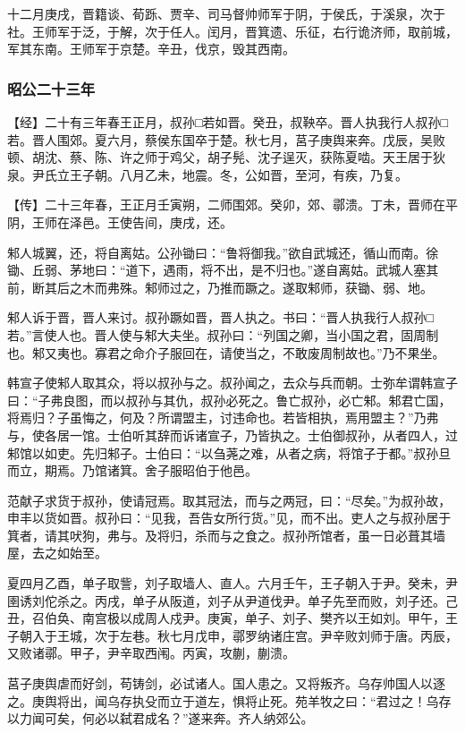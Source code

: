 \documentclass[]{article}
\begin{document}
十二月庚戌，晋籍谈、荀跞、贾辛、司马督帅师军于阴，于侯氏，于溪泉，次于社。王师军于泛，于解，次于任人。闰月，晋箕遗、乐征，右行诡济师，取前城，军其东南。王师军于京楚。辛丑，伐京，毁其西南。

\hypertarget{header-n2737}{%
\subsubsection{昭公二十三年}\label{header-n2737}}

【经】二十有三年春王正月，叔孙□若如晋。癸丑，叔鞅卒。晋人执我行人叔孙□若。晋人围郊。夏六月，蔡侯东国卒于楚。秋七月，莒子庚舆来奔。戊辰，吴败顿、胡沈、蔡、陈、许之师于鸡父，胡子髡、沈子逞灭，获陈夏啮。天王居于狄泉。尹氏立王子朝。八月乙未，地震。冬，公如晋，至河，有疾，乃复。

【传】二十三年春，王正月壬寅朔，二师围郊。癸卯，郊、鄩溃。丁未，晋师在平阴，王师在泽邑。王使告间，庚戌，还。

邾人城翼，还，将自离姑。公孙锄曰：``鲁将御我。''欲自武城还，循山而南。徐锄、丘弱、茅地曰：``道下，遇雨，将不出，是不归也。''遂自离姑。武城人塞其前，断其后之木而弗殊。邾师过之，乃推而蹶之。遂取邾师，获锄、弱、地。

邾人诉于晋，晋人来讨。叔孙蹶如晋，晋人执之。书曰：``晋人执我行人叔孙□若。''言使人也。晋人使与邾大夫坐。叔孙曰：``列国之卿，当小国之君，固周制也。邾又夷也。寡君之命介子服回在，请使当之，不敢废周制故也。''乃不果坐。

韩宣子使邾人取其众，将以叔孙与之。叔孙闻之，去众与兵而朝。士弥牟谓韩宣子曰：``子弗良图，而以叔孙与其仇，叔孙必死之。鲁亡叔孙，必亡邾。邾君亡国，将焉归？子虽悔之，何及？所谓盟主，讨违命也。若皆相执，焉用盟主？''乃弗与，使各居一馆。士伯听其辞而诉诸宣子，乃皆执之。士伯御叔孙，从者四人，过邾馆以如吏。先归邾子。士伯曰：``以刍荛之难，从者之病，将馆子于都。''叔孙旦而立，期焉。乃馆诸箕。舍子服昭伯于他邑。

范献子求货于叔孙，使请冠焉。取其冠法，而与之两冠，曰：``尽矣。''为叔孙故，申丰以货如晋。叔孙曰：``见我，吾告女所行货。''见，而不出。吏人之与叔孙居于箕者，请其吠狗，弗与。及将归，杀而与之食之。叔孙所馆者，虽一日必葺其墙屋，去之如始至。

夏四月乙酉，单子取訾，刘子取墙人、直人。六月壬午，王子朝入于尹。癸未，尹圉诱刘佗杀之。丙戌，单子从阪道，刘子从尹道伐尹。单子先至而败，刘子还。己丑，召伯奂、南宫极以成周人戍尹。庚寅，单子、刘子、樊齐以王如刘。甲午，王子朝入于王城，次于左巷。秋七月戊申，鄩罗纳诸庄宫。尹辛败刘师于唐。丙辰，又败诸鄩。甲子，尹辛取西闱。丙寅，攻蒯，蒯溃。

莒子庚舆虐而好剑，苟铸剑，必试诸人。国人患之。又将叛齐。乌存帅国人以逐之。庚舆将出，闻乌存执殳而立于道左，惧将止死。苑羊牧之曰：``君过之！乌存以力闻可矣，何必以弑君成名？''遂来奔。齐人纳郊公。
\end{document}
